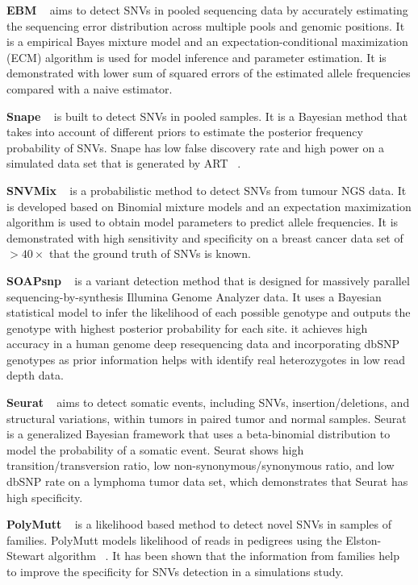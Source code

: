 \documentclass[11pt,reqno]{amsart}
\begin{document}
\textbf{EBM} ~\citep{Zhou2012} aims to detect SNVs in pooled sequencing data by accurately estimating the sequencing error distribution across multiple pools and genomic positions. 
It is a empirical Bayes mixture model and an expectation-conditional maximization (ECM) algorithm is used for model inference and parameter estimation.
It is demonstrated with lower sum of squared errors of the estimated allele frequencies compared with a naive estimator.

\textbf{Snape} ~\citep{Raineri2012} is built to detect SNVs in pooled samples.
It is a Bayesian method that takes into account of different priors to estimate the posterior frequency probability of SNVs.
Snape has low false discovery rate and high power on a simulated data set that is generated by ART ~\citep{huang2012art}.

\textbf{SNVMix} ~\citep{Goya2010} is a probabilistic method to detect SNVs from tumour NGS data.
It is developed based on Binomial mixture models and an expectation maximization algorithm is used to obtain model parameters to predict allele frequencies.
It is demonstrated with high sensitivity and specificity on a breast cancer data set of $> 40 \times$ that the ground truth of SNVs is known.

\textbf{SOAPsnp} ~\citep{Li2009} is a variant detection method that is designed for massively parallel sequencing-by-synthesis Illumina Genome Analyzer data.
It uses a Bayesian statistical model to infer the likelihood of each possible genotype and outputs the genotype with highest posterior probability for each site.
it achieves high accuracy in a human genome deep resequencing data and incorporating dbSNP genotypes as prior information helps with identify real heterozygotes in low read depth data.

\textbf{Seurat} ~\citep{Christoforides2013} aims to detect somatic events, including SNVs, insertion/deletions, and structural variations, within tumors in paired tumor and normal samples.
Seurat is a generalized Bayesian framework that uses a beta-binomial distribution to model the probability of a somatic event.
Seurat shows high transition/transversion ratio, low non-synonymous/synonymous ratio, and low dbSNP rate on a lymphoma tumor data set, which demonstrates that Seurat has high specificity.

\textbf{PolyMutt} ~\citep{li2012likelihood} is a likelihood based method to detect novel SNVs in samples of families.
PolyMutt models likelihood of reads in pedigrees using the Elston-Stewart algorithm ~\citep{elston1971general}.
It has been shown that the information from families help to improve the specificity for SNVs detection in a simulations study.
\end{document}

